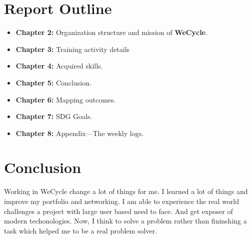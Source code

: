\section{Report Outline}

\begin{itemize}
    \item \textbf{Chapter 2:} Organization structure and mission of \textbf{WeCycle}.
    \item \textbf{Chapter 3:} Training activity details
    \item \textbf{Chapter 4:} Acquired skills.
    \item \textbf{Chapter 5:} Conclusion.
    \item \textbf{Chapter 6:} Mapping outcomes.
    \item \textbf{Chapter 7:} SDG Goals.
    \item \textbf{Chapter 8:} Appendix—The weekly logs.
\end{itemize}

\section{Conclusion}

\par Working in WeCycle change a lot of things for me. I learned a lot of things and improve my portfolio and networking.
I am able to experience the real world challenges a project with large user based need to face. And get exposer of modern techonologies. Now, I think to solve a problem rather than fininshing a task which helped me to be a real problem solver.